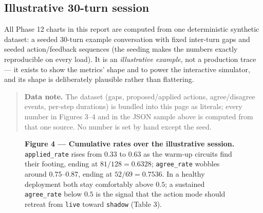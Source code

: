 \documentclass[11pt]{article}
\begin{document}
\subsection{Illustrative 30-turn session}

All Phase 12 charts in this report are computed from one deterministic synthetic dataset: a seeded 30-turn example conversation with fixed inter-turn gaps and seeded action/feedback sequences (the seeding makes the numbers exactly reproducible on every load). It is an \emph{illustrative example}, not a production trace — it exists to show the metrics' shape and to power the interactive simulator, and its shape is deliberately plausible rather than flattering.

\begin{quote}
\small \textbf{Data note.} The dataset (gaps, proposed/applied actions, agree/disagree events, per-step durations) is bundled into this page as literals; every number in Figures 3–4 and in the JSON sample above is computed from that one source. No number is set by hand except the seed.
\end{quote}

\begin{figure}[htbp]
\centering
{}
\caption*{\textbf{Figure 4 — Cumulative rates over the illustrative session.} \texttt{applied\_rate} rises from \(0.33\) to \(0.63\) as the warm-up circuits find their footing, ending at \(81/128 = 0.6328\); \texttt{agree\_rate} wobbles around \(0.75\)–\(0.87\), ending at \(52/69 = 0.7536\). In a healthy deployment both stay comfortably above \(0.5\); a sustained \texttt{agree\_rate} below \(0.5\) is the signal that the action mode should retreat from \texttt{live} toward \texttt{shadow} (Table 3).}
\end{figure}
\end{document}
